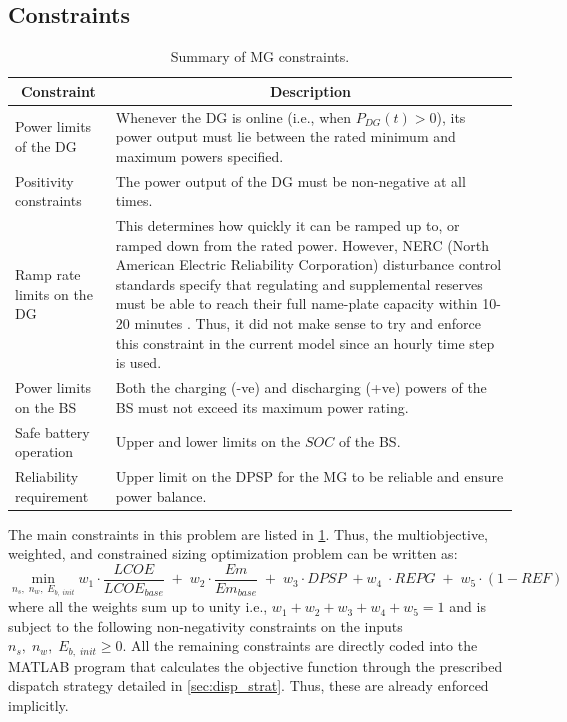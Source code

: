 \documentclass[final,3p,times]{elsarticle}
\begin{document}
\subsection{Constraints}

\begin{table}[htbp] 
\centering
\begin{tabular}{p{5cm} p{10cm}}
\toprule
\multicolumn{1}{c}{\textbf{Constraint}} & \multicolumn{1}{c}{\textbf{Description}}    \\
\midrule
Power limits of the DG & Whenever the DG is online (i.e., when $P_{DG}(t) > 0$), its power output must lie between the rated minimum and maximum powers specified. \\ [1ex]
Positivity constraints & The power output of the DG must be non-negative at all times. \\ [1ex]
Ramp rate limits on the DG & This determines how quickly it can be ramped up to, or ramped down from the rated power. However, NERC (North American Electric Reliability Corporation) disturbance control standards specify that regulating and supplemental reserves must be able to reach their full name-plate capacity within 10-20 minutes \cite{nerc}. Thus, it did not make sense to try and enforce this constraint in the current model since an hourly time step is used. \\ [1ex]
Power limits on the BS & Both the charging (-ve) and discharging (+ve) powers of the BS must not exceed its maximum power rating. \\ [1ex]
Safe battery operation & Upper and lower limits on the $SOC$ of the BS. \\ [1ex]
Reliability requirement & Upper limit on the DPSP for the MG to be reliable and ensure power balance. \\ [1ex]
\bottomrule
\end{tabular}
\caption{Summary of MG constraints.}
\label{tab:dispatch_constraints} 
\end{table}

The main constraints in this problem are listed in \cref{tab:dispatch_constraints}. Thus, the multiobjective, weighted, and constrained sizing optimization problem can be written as:
\begin{equation}
    \label{eq:sizing}
    \min_{n_s, \; n_w, \; E_{b,\;init}} w_1 \cdot \frac{LCOE}{LCOE_{base}} \; + \; w_2 \cdot \frac{Em}{Em_{base}} \; + \; w_3 \cdot DPSP \; + w_4 \; \cdot REPG \; + \; w_5 \cdot (1-REF)
\end{equation}
where all the weights sum up to unity i.e., $w_1 + w_2 + w_3 + w_4 + w_5 = 1$ and is subject to the following non-negativity constraints on the inputs $n_s, \; n_w, \; E_{b,\; init} \geq 0$. All the remaining constraints are directly coded into the MATLAB program that calculates the objective function through the prescribed dispatch strategy detailed in \cref{sec:disp_strat}. Thus, these are already enforced implicitly.
\end{document}
